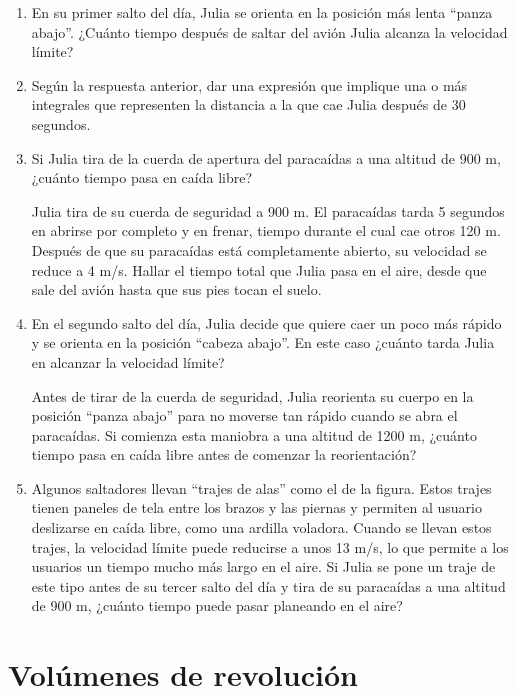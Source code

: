 \documentclass[
  a4paper,
]{scrreport}
\begin{document}
\begin{enumerate}
\def\labelenumi{\arabic{enumi}.}
\item
  En su primer salto del día, Julia se orienta en la posición más lenta
  ``panza abajo''. ¿Cuánto tiempo después de saltar del avión Julia
  alcanza la velocidad límite?
\item
  Según la respuesta anterior, dar una expresión que implique una o más
  integrales que representen la distancia a la que cae Julia después de
  30 segundos.
\item
  Si Julia tira de la cuerda de apertura del paracaídas a una altitud de
  900 m, ¿cuánto tiempo pasa en caída libre?

  Julia tira de su cuerda de seguridad a 900 m. El paracaídas tarda 5
  segundos en abrirse por completo y en frenar, tiempo durante el cual
  cae otros 120 m. Después de que su paracaídas está completamente
  abierto, su velocidad se reduce a 4 m/s. Hallar el tiempo total que
  Julia pasa en el aire, desde que sale del avión hasta que sus pies
  tocan el suelo.
\item
  En el segundo salto del día, Julia decide que quiere caer un poco más
  rápido y se orienta en la posición ``cabeza abajo''. En este caso
  ¿cuánto tarda Julia en alcanzar la velocidad límite?

  Antes de tirar de la cuerda de seguridad, Julia reorienta su cuerpo en
  la posición ``panza abajo'' para no moverse tan rápido cuando se abra
  el paracaídas. Si comienza esta maniobra a una altitud de 1200 m,
  ¿cuánto tiempo pasa en caída libre antes de comenzar la reorientación?
\item
  Algunos saltadores llevan ``trajes de alas'' como el de la figura.
  Estos trajes tienen paneles de tela entre los brazos y las piernas y
  permiten al usuario deslizarse en caída libre, como una ardilla
  voladora. Cuando se llevan estos trajes, la velocidad límite puede
  reducirse a unos 13 m/s, lo que permite a los usuarios un tiempo mucho
  más largo en el aire. Si Julia se pone un traje de este tipo antes de
  su tercer salto del día y tira de su paracaídas a una altitud de 900
  m, ¿cuánto tiempo puede pasar planeando en el aire?
\end{enumerate}


\hypertarget{voluxfamenes-de-revoluciuxf3n}{%
\chapter{Volúmenes de revolución}\label{voluxfamenes-de-revoluciuxf3n}}
\end{document}
